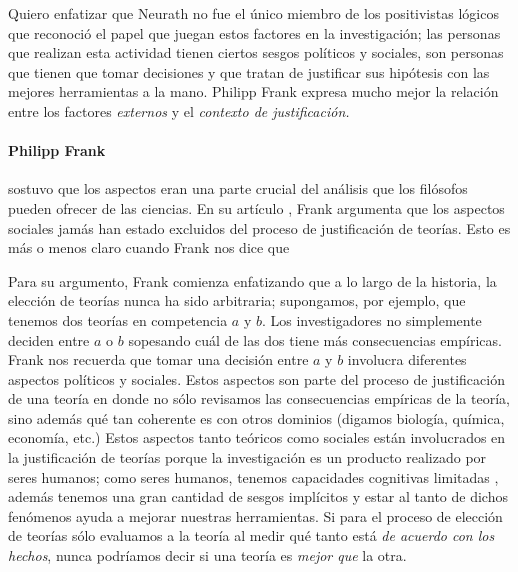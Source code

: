 Quiero enfatizar que Neurath no fue el único miembro de los positivistas lógicos que reconoció el papel que juegan estos factores en la investigación;
las personas que realizan esta actividad tienen ciertos sesgos políticos y sociales, son personas que tienen que tomar decisiones y que tratan de justificar sus hipótesis con las mejores herramientas a la mano.
Philipp Frank expresa mucho mejor la relación entre los factores \emph{externos} y el \emph{contexto de justificación.}

\paragraph{Philipp Frank} sostuvo que los aspectos  eran
una parte crucial del análisis que los filósofos pueden ofrecer de las
ciencias. 
En su artículo , Frank argumenta que los
aspectos sociales jamás han estado excluidos del proceso de
justificación de teorías. 
Esto es más o menos claro cuando Frank nos dice
que 
\parencite[p.~143]{Frank1954}

Para su argumento, Frank comienza enfatizando que a lo largo de la historia, la elección de teorías nunca ha sido arbitraria;
supongamos, por ejemplo, que tenemos dos teorías en competencia $a$ y $b$.
Los investigadores no simplemente deciden entre $a$ o $b$ sopesando cuál de las dos tiene más consecuencias empíricas.
Frank nos recuerda que tomar una decisión entre $a$ y $b$ involucra diferentes aspectos políticos y sociales.
Estos aspectos son parte del proceso de justificación de una teoría en donde no sólo revisamos las consecuencias empíricas de la teoría, sino además qué tan coherente es con otros dominios (digamos biología, química, economía, etc.)
Estos aspectos tanto teóricos como sociales están involucrados en la justificación de teorías porque la investigación es un producto realizado por seres humanos;
como seres humanos, tenemos capacidades cognitivas limitadas \parencite{Potochnik2017-POTIAT-3}, además tenemos una gran cantidad de sesgos implícitos \parencite{nordell2021end} y estar al tanto de dichos fenómenos ayuda a mejorar nuestras herramientas.
Si para el proceso de elección de teorías sólo evaluamos a la teoría al medir qué tanto está \emph{de acuerdo con los hechos}, nunca podríamos decir si una teoría es \emph{mejor que} la otra.

